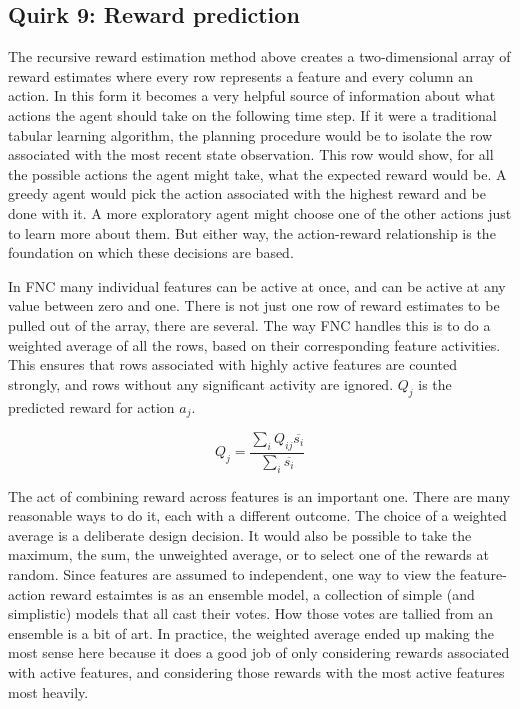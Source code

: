 \subsection*{Quirk 9: Reward prediction}
\label{algoreward prediction}

The recursive reward estimation method above creates a two-dimensional array
of reward estimates where every row represents a feature and every column
an action. In this form it becomes a very helpful source of information
about what actions the agent should take on the following time step.
If it were a traditional tabular learning algorithm, the planning procedure would
be to isolate the row associated with the most recent state observation.
This row would show, for all the possible actions the agent might take,
what the expected reward would be. A greedy agent would pick the action
associated with the highest reward and be done with it. A more exploratory
agent might choose one of the other actions just to learn more about them.
But either way, the action-reward relationship is the foundation on which
these decisions are based.

In FNC many individual features can be active at once, and can be active
at any value between zero and one. There is not just one row of reward
estimates to be pulled out of the array, there are several. The way 
FNC handles this is to do a weighted average of all the rows, based on
their corresponding feature activities. This ensures that rows associated
with highly active features are counted strongly, and rows without 
any significant activity are ignored. $Q_j$ is the predicted reward for
action $a_j$.

\begin{equation}
Q_{j} = \frac{\sum_i Q_{ij} \overline{s_i}}
{\sum_i \overline{s_i}}
\end{equation}

The act of combining reward across features is an important one.
There are many reasonable ways to do it, each with a different outcome.
The choice of a weighted average is a deliberate design decision.
It would also be possible to take the maximum, the sum, the unweighted
average, or to select one of the rewards at random.
Since features are assumed to independent, one way to view the
feature-action reward estaimtes is as an ensemble model, a collection
of simple (and simplistic) models that all cast their votes. How those
votes are tallied from an ensemble is a bit of art. In practice, the
weighted average ended up making the most sense here because it does a good
job of only considering rewards associated with active features, and considering
those rewards with the most active features most heavily.

